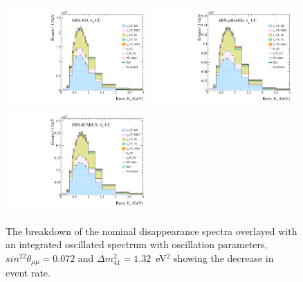 \begin{figure}[h!]
  {\includegraphics[width=0.49\textwidth]{figures-chap6/spectra/numu_disapp_overlay_dmsq_1.32_sinsq2th_0.072_spectrum_sbn_nd_BNB_FHC_0_modes.pdf}}
  {\includegraphics[width=0.49\textwidth]{figures-chap6/spectra/numu_disapp_overlay_dmsq_1.32_sinsq2th_0.072_spectrum_sbn_uboone_BNB_FHC_1_modes.pdf}}
  {\includegraphics[width=0.49\textwidth]{figures-chap6/spectra/numu_disapp_overlay_dmsq_1.32_sinsq2th_0.072_spectrum_sbn_icarus_BNB_FHC_2_modes.pdf}}
  \captionsetup{width=0.49\textwidth}
  \parbox[b]{0.49\textwidth}%
  {
    \caption[SBN \numu CC inclusive reconstructed neutrino energy spectra with oscillated spectrum overlayed]{The breakdown of the nominal \numu disappearance spectra overlayed with an integrated oscillated spectrum with oscillation parameters, $sin^22\theta_{\mu \mu} = 0.072$ and $\Delta m^2_{41} = 1.32$~eV$^2$ showing the decrease in event rate.\\\\\\}
    \label{fig:numu_disapp_spectra} 
  }
\end{figure}

